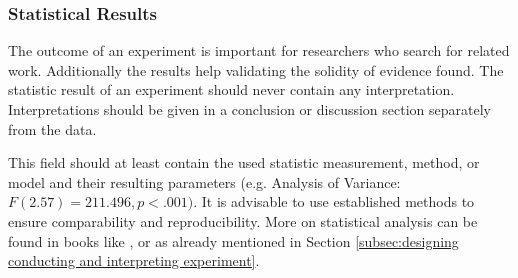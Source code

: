 
\subsubsection{Statistical Results}
\label{statisticalresults}

The outcome of an experiment is important for researchers who search for related work. Additionally the results help validating the solidity of evidence found. The statistic result of an experiment should never contain any interpretation. Interpretations should be given in a conclusion or discussion section separately from the data.

This field should at least contain the used statistic measurement, method, or model and their resulting parameters (e.g. Analysis of Variance: $F(2.57)=211.496, p<.001)$. It is advisable to use established methods to ensure comparability and reproducibility. More on statistical analysis can be found in books like \cite{Wohlin2012}, or \cite{Albert2008} as already mentioned in Section \ref{subsec:designing conducting and interpreting experiment}.
